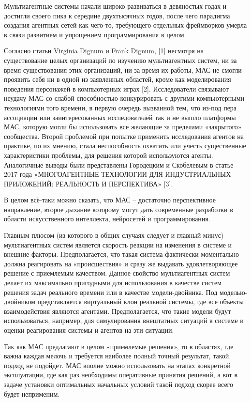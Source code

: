 Мультиагентные системы начали широко развиваться в девяностых годах и достигли своего пика к середине двухтысячных годов, после чего парадигма создания агентных сетей как чего-то, требующего отдельных фреймворков умерла в связи развитием и упрощением программирования в целом.

Согласно статьи Virginia Dignum и Frank Dignum, [1] несмотря на существование целых организаций по изучению мультиагентных систем, ни за время существования этих организаций, ни за время их работы, МАС не смогли проявить себя ни в одной из заявленных областей, кроме как моделирования поведения персонажей в компьютерных играх [2]. Исследователи связывают неудачу МАС со слабой способностью конкурировать с другими компьютерными технологиями того времени, в первую очередь вызванной тем, что из-под пера ассоциации или заинтересованных исследователей так и не вышло платформы МАС, которую могли бы использовать все желающие за пределами «закрытого» сообщества. Второй проблемой при попытке применить исследования агентов на практике, по их мнению, стала неспособность охватить или учесть существенные характеристики проблемы, для решения которой используются агенты. Аналогичные выводы были представлены Городецким и Скобелевым в статье 2017 года «МНОГОАГЕНТНЫЕ ТЕХНОЛОГИИ ДЛЯ ИНДУСТРИАЛЬНЫХ ПРИЛОЖЕНИЙ: РЕАЛЬНОСТЬ И ПЕРСПЕКТИВА» [3].

В целом всё-таки можно сказать, что МАС – достаточно перспективное направление, второе дыхание которому могут дать современные разработки в области искусственного интеллекта, нейросетей и программирования.

Главным плюсом (из которого в общих случаях следует и главный минус) мультиагентных систем является скорость реакции на изменения в системе и внешние факторы. Предполагается, что такая система фактически моментально должна реагировать на «происшествия» и сразу же выдавать удовлетворяющее решение с приемлемым качеством. Данное свойство мультиагентных систем делает их максимально пригодными для использования в качестве систем решения задач реального времени или в качестве модели-двойника.
Под моделью-двойником представляется виртуальный клон реальной системы, где все объекты взаимодействия являются агентами. Предполагается, что такие модели будут использоваться, например, для симулирования внештатных ситуаций в системе и оценки реагирования системы и агентов на эти ситуации. 

Так как МАС предлагают в целом «приемлемые решения», то в областях, где важна каждая мелочь и требуется наиболее полный точный результат, такой подход не подойдет. МАС вполне можно использовать на этапах конкретной эксплуатации, где как раз необходимы оперативные принятия решений, а вот в задаче установки оптимальных начальных условий такой подход скорее всего будет неприменим.

